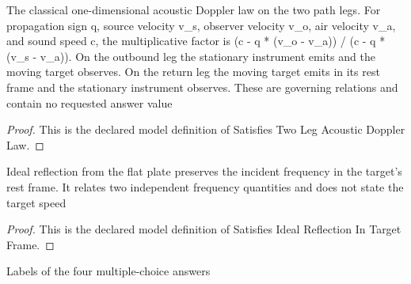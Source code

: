 \begin{definition}
  \label{def:physics:phyx-mini-0327:phyxminiproblems-problemphyxmini0327-satisfiestwolegacousticdopplerlaw}
  The classical one-dimensional acoustic Doppler law on the two path legs. For propagation sign q, source velocity v\_s, observer velocity v\_o, air velocity v\_a, and sound speed c, the multiplicative factor is (c - q * (v\_o - v\_a)) / (c - q * (v\_s - v\_a)). On the outbound leg the stationary instrument emits and the moving target observes. On the return leg the moving target emits in its rest frame and the stationary instrument observes. These are governing relations and contain no requested answer value
\end{definition}
\begin{proof}
  This is the declared model definition of Satisfies Two Leg Acoustic Doppler Law.
\end{proof}
\begin{definition}
  \label{def:physics:phyx-mini-0327:phyxminiproblems-problemphyxmini0327-satisfiesidealreflectionintargetframe}
  Ideal reflection from the flat plate preserves the incident frequency in the target's rest frame. It relates two independent frequency quantities and does not state the target speed
\end{definition}
\begin{proof}
  This is the declared model definition of Satisfies Ideal Reflection In Target Frame.
\end{proof}
\begin{definition}
  \label{def:physics:phyx-mini-0327:phyxminiproblems-problemphyxmini0327-answerchoice}
  Labels of the four multiple-choice answers
\end{definition}
